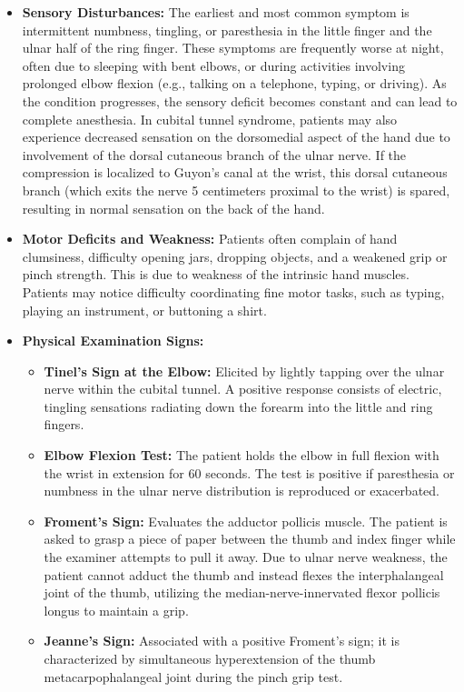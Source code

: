 \begin{itemize}
\item \textbf{Sensory Disturbances:} The earliest and most common symptom is intermittent numbness, tingling, or paresthesia in the little finger and the ulnar half of the ring finger. These symptoms are frequently worse at night, often due to sleeping with bent elbows, or during activities involving prolonged elbow flexion (e.g., talking on a telephone, typing, or driving). As the condition progresses, the sensory deficit becomes constant and can lead to complete anesthesia. In cubital tunnel syndrome, patients may also experience decreased sensation on the dorsomedial aspect of the hand due to involvement of the dorsal cutaneous branch of the ulnar nerve. If the compression is localized to Guyon's canal at the wrist, this dorsal cutaneous branch (which exits the nerve 5 centimeters proximal to the wrist) is spared, resulting in normal sensation on the back of the hand.
\item \textbf{Motor Deficits and Weakness:} Patients often complain of hand clumsiness, difficulty opening jars, dropping objects, and a weakened grip or pinch strength. This is due to weakness of the intrinsic hand muscles. Patients may notice difficulty coordinating fine motor tasks, such as typing, playing an instrument, or buttoning a shirt.
\item \textbf{Physical Examination Signs:}
  \begin{itemize}
  \item \textbf{Tinel's Sign at the Elbow:} Elicited by lightly tapping over the ulnar nerve within the cubital tunnel. A positive response consists of electric, tingling sensations radiating down the forearm into the little and ring fingers.
  \item \textbf{Elbow Flexion Test:} The patient holds the elbow in full flexion with the wrist in extension for 60 seconds. The test is positive if paresthesia or numbness in the ulnar nerve distribution is reproduced or exacerbated.
  \item \textbf{Froment's Sign:} Evaluates the adductor pollicis muscle. The patient is asked to grasp a piece of paper between the thumb and index finger while the examiner attempts to pull it away. Due to ulnar nerve weakness, the patient cannot adduct the thumb and instead flexes the interphalangeal joint of the thumb, utilizing the median-nerve-innervated flexor pollicis longus to maintain a grip.
  \item \textbf{Jeanne's Sign:} Associated with a positive Froment's sign; it is characterized by simultaneous hyperextension of the thumb metacarpophalangeal joint during the pinch grip test.

\end{itemize}
\end{itemize}

